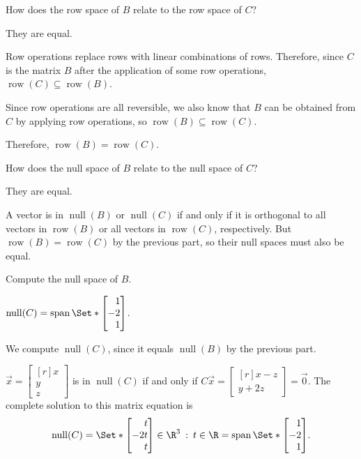 \documentclass{problemset}
\DeclareMathOperator{\Span}{span}
\DeclareMathOperator{\Null}{null}
\DeclareMathOperator{\Row}{row}
\newcommand{\mat}[1]{\begin{bmatrix*}[r]#1\end{bmatrix*}}
\providecommand\given{}
\newcommand\SetSymbol[1][]{%
	\nonscript\::%
	\allowbreak
	\nonscript\:
	\mathopen{}}
\renewcommand\given{\SetSymbol[\delimsize]}
\begin{document}
	\begin{parts}
		\item How does the row space of $B$ relate to the row space of $C$?
			\begin{solution}
				They are equal.

				Row operations replace rows with linear combinations of rows.
				Therefore, since $C$ is the matrix $B$ after the application of
				some row operations, $\Row(C)\subseteq\Row(B)$.

				Since row operations are all reversible, we also know that $B$
				can be obtained from $C$ by applying row operations, so
				$\Row(B)\subseteq\Row(C)$.

				Therefore, $\Row(B)=\Row(C)$.
			\end{solution}
		\item How does the null space of $B$ relate to the null space of $C$?
			\begin{solution}
				They are equal.

				A vector is in $\Null(B)$ or $\Null(C)$ if and only if it is
				orthogonal to all vectors in $\Row(B)$ or all vectors in $\Row(C)$,
				respectively. But $\Row(B)=\Row(C)$ by the previous part, so
				their null spaces must also be equal.
			\end{solution}
		\item Compute the null space of $B$.
			\begin{solution}
				$\Null(C)=\Span\Set*{\mat{1\\-2\\1}}$.

				We compute $\Null(C)$, since it equals $\Null(B)$ by the previous part.

				$\vec x=\mat{x\\y\\z}$ is in $\Null(C)$ if and only if
				$C\vec x = \mat{x-z\\y+2z} = \vec 0$. The complete solution to this matrix equation is
				\[
					\Null(C)=
					\Set*{\mat{t\\-2{t}\\t}\in\R^3 \given t\in\R}
					=\Span\Set*{\mat{1\\-2\\1}}.
				\]
			\end{solution}
	\end{parts}
\end{document}
